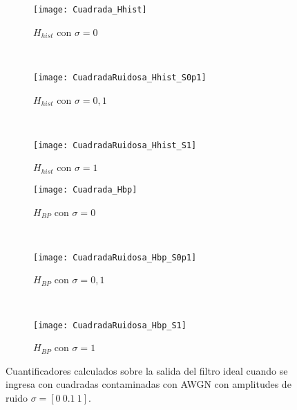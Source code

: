 \begin{figure}[h]
    \centering
    \begin{subfigure}[t]{.49\textwidth}
        \texttt{[image: Cuadrada\_Hhist]}
        \caption{$H_{hist}$ con $\sigma=0$}
        \label{subfig:HhistCuadradaRuidosa_Sigma_0}
    \end{subfigure}
    ~ %
    \begin{subfigure}[t]{.49\textwidth}
        \texttt{[image: CuadradaRuidosa\_Hhist\_S0p1]}
        \caption{$H_{hist}$ con $\sigma=0,1$}
        \label{subfig:HhistCuadradaRuidosa_Sigma_0p1}
    \end{subfigure}
    ~ %
    \begin{subfigure}[t]{.49\textwidth}
        \texttt{[image: CuadradaRuidosa\_Hhist\_S1]}
        \caption{$H_{hist}$ con $\sigma=1$}
        \label{subfig:HhistCuadradaRuidosa_Sigma_1}
    \end{subfigure}
    \begin{subfigure}[t]{.49\textwidth}
        \texttt{[image: Cuadrada\_Hbp]}
        \caption{$H_{BP}$ con $\sigma=0$}
        \label{subfig:HbpCuadradaRuidosa_Sigma_0}
    \end{subfigure}
    ~ %
    \begin{subfigure}[t]{.49\textwidth}
        \texttt{[image: CuadradaRuidosa\_Hbp\_S0p1]}
        \caption{$H_{BP}$ con $\sigma=0,1$}
        \label{subfig:HbpCuadradaRuidosa_Sigma_0p1}
    \end{subfigure}
    ~ %
    \begin{subfigure}[t]{.49\textwidth}
        \texttt{[image: CuadradaRuidosa\_Hbp\_S1]}
        \caption{$H_{BP}$ con $\sigma=1$}
        \label{subfig:HbpCuadradaRuidosa_Sigma_1}
    \end{subfigure}
    \caption{Cuantificadores calculados sobre la salida del filtro ideal cuando se ingresa con cuadradas contaminadas con AWGN con amplitudes de ruido $\sigma=[0~0.1~1]$.}\label{fig:HCuadradaRuidosa_Sigma}
\end{figure}